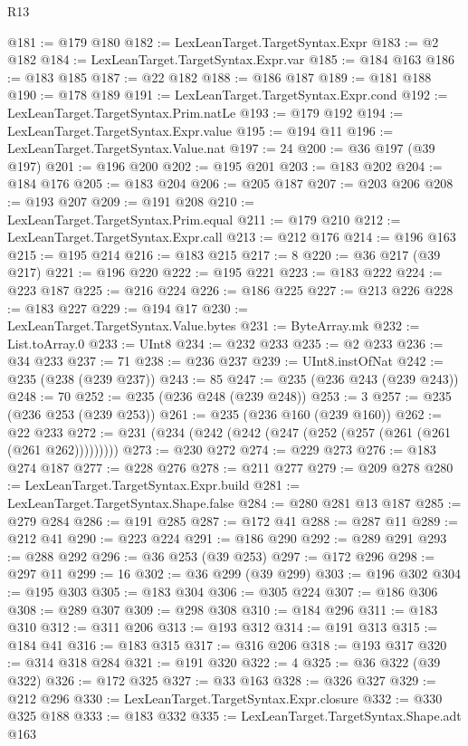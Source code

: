 \begin{lexlean}{R13}
\begin{coremodule}
@181 := @179 @180
@182 := LexLeanTarget.TargetSyntax.Expr
@183 := @2 @182
@184 := LexLeanTarget.TargetSyntax.Expr.var
@185 := @184 @163
@186 := @183 @185
@187 := @22 @182
@188 := @186 @187
@189 := @181 @188
@190 := @178 @189
@191 := LexLeanTarget.TargetSyntax.Expr.cond
@192 := LexLeanTarget.TargetSyntax.Prim.natLe
@193 := @179 @192
@194 := LexLeanTarget.TargetSyntax.Expr.value
@195 := @194 @11
@196 := LexLeanTarget.TargetSyntax.Value.nat
@197 := 24
@200 := @36 @197 (@39 @197)
@201 := @196 @200
@202 := @195 @201
@203 := @183 @202
@204 := @184 @176
@205 := @183 @204
@206 := @205 @187
@207 := @203 @206
@208 := @193 @207
@209 := @191 @208
@210 := LexLeanTarget.TargetSyntax.Prim.equal
@211 := @179 @210
@212 := LexLeanTarget.TargetSyntax.Expr.call
@213 := @212 @176
@214 := @196 @163
@215 := @195 @214
@216 := @183 @215
@217 := 8
@220 := @36 @217 (@39 @217)
@221 := @196 @220
@222 := @195 @221
@223 := @183 @222
@224 := @223 @187
@225 := @216 @224
@226 := @186 @225
@227 := @213 @226
@228 := @183 @227
@229 := @194 @17
@230 := LexLeanTarget.TargetSyntax.Value.bytes
@231 := ByteArray.mk
@232 := List.toArray.{0}
@233 := UInt8
@234 := @232 @233
@235 := @2 @233
@236 := @34 @233
@237 := 71
@238 := @236 @237
@239 := UInt8.instOfNat
@242 := @235 (@238 (@239 @237))
@243 := 85
@247 := @235 (@236 @243 (@239 @243))
@248 := 70
@252 := @235 (@236 @248 (@239 @248))
@253 := 3
@257 := @235 (@236 @253 (@239 @253))
@261 := @235 (@236 @160 (@239 @160))
@262 := @22 @233
@272 := @231 (@234 (@242 (@242 (@247 (@252 (@257 (@261 (@261 (@261 @262)))))))))
@273 := @230 @272
@274 := @229 @273
@276 := @183 @274 @187
@277 := @228 @276
@278 := @211 @277
@279 := @209 @278
@280 := LexLeanTarget.TargetSyntax.Expr.build
@281 := LexLeanTarget.TargetSyntax.Shape.false
@284 := @280 @281 @13 @187
@285 := @279 @284
@286 := @191 @285
@287 := @172 @41
@288 := @287 @11
@289 := @212 @41
@290 := @223 @224
@291 := @186 @290
@292 := @289 @291
@293 := @288 @292
@296 := @36 @253 (@39 @253)
@297 := @172 @296
@298 := @297 @11
@299 := 16
@302 := @36 @299 (@39 @299)
@303 := @196 @302
@304 := @195 @303
@305 := @183 @304
@306 := @305 @224
@307 := @186 @306
@308 := @289 @307
@309 := @298 @308
@310 := @184 @296
@311 := @183 @310
@312 := @311 @206
@313 := @193 @312
@314 := @191 @313
@315 := @184 @41
@316 := @183 @315
@317 := @316 @206
@318 := @193 @317
@320 := @314 @318 @284
@321 := @191 @320
@322 := 4
@325 := @36 @322 (@39 @322)
@326 := @172 @325
@327 := @33 @163
@328 := @326 @327
@329 := @212 @296
@330 := LexLeanTarget.TargetSyntax.Expr.closure
@332 := @330 @325 @188
@333 := @183 @332
@335 := LexLeanTarget.TargetSyntax.Shape.adt @163

\end{coremodule}
\end{lexlean}
